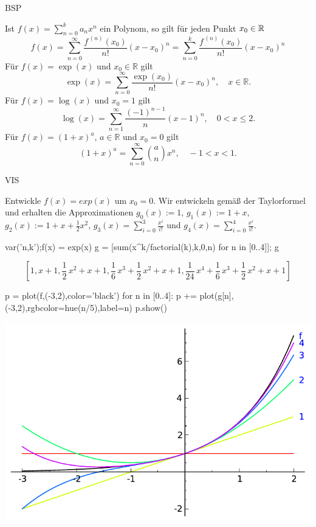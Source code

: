 \documentclass[fontsize=12pt,paper=a4,twoside,bibtotoc,idxtotoc,
liststotoc,pagesize,BCOR1.2cm,DIV15,chapterprefix,pagesize=pdftex]{scrbook}
\theoremstyle{plain}
\theoremstyle{definition}
\theoremstyle{remark}
\begin{document}
BSP


 Ist $f(x) = \sum_{n=0}^k a_n x^n$ ein Polynom, so gilt für jeden Punkt $x_0 \in \mathbb{R}$
\[
 f(x) = \sum_{n=0}^\infty \frac{f^{\,(n)}(x_0)}{n!}(x-x_0)^n 
 = \sum_{n=0}^k  \frac{f^{\,(n)}(x_0)}{n!}(x-x_0)^n
\]
 Für $f(x)=\exp(x)$ und $x_0 \in \mathbb{R}$ gilt 
\[ \exp(x)= \sum_{n=0}^\infty \frac{\exp(x_0)}{n!} (x-x_0)^n, \quad x
\in \mathbb{R}.\]
 Für $f(x)=\log(x)$ und $x_0=1$ gilt
\[ \log (x) = \sum_{n=1}^\infty \frac{(-1)^{n-1}}{n}(x-1)^n, \quad 0 <
x \leq 2.\]
 Für $f(x)= (1+x)^a$, $a\in \mathbb{R}$  und $x_0=0$ gilt
\[ (1+x)^a= \sum_{n =0}^\infty \binom{a}{n}{x^n}, \quad -1 <
x < 1. \]


VIS

Entwickle $f(x)=exp(x)$ um $x_0=0$. Wir entwickeln gemäß der Taylorformel und erhalten die
Approximationen $g_0(x):=1$, $g_1(x):=1+x$,
$g_2(x):=1+x+\frac{1}{2}x^2$, $g_3(x)=\sum_{i=0}^3 \frac{x^i}{i!}$ und 
$g_4(x)=\sum_{i=0}^4 \frac{x^i}{i!}$.

\begin{sagein}
var('n,k');f(x) = exp(x)
g = [sum(x^k/factorial(k),k,0,n) for n in [0..4]]; g
\end{sagein}
{\color{blue}\[ \left[1, x + 1, \frac{1}{2} \, x^{2} + x + 1, \frac{1}{6} \, x^{3} +
\frac{1}{2} \, x^{2} + x + 1, \frac{1}{24} \, x^{4} + \frac{1}{6} \,
x^{3} + \frac{1}{2} \, x^{2} + x + 1\right]\]}
\begin{sagein}
p = plot(f,(-3,2),color='black')
for n in [0..4]:
    p += plot(g[n],(-3,2),rgbcolor=hue(n/5),label=n)
p.show()
\end{sagein}
 \begin{center}
  \includegraphics[width=\textwidth]{taylorexp.pdf}
 \end{center}
\end{document}
